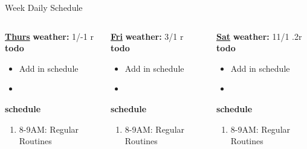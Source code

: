 {{\begin{block}{Week Daily Schedule}
\begin{columns}
          \begin{column}{0.14\textwidth}{\small \underline{\bf Thurs}}
            {\small \bf weather: } 1/-1 r \\ 
            {\small {\bf todo}} \\ 
            \begin{itemize}
              \tiny \item \tiny Add in schedule
            \item \tiny 
            \end{itemize} 
                {\small {\bf schedule}} \\
                \begin{enumerate} 
                  \tiny \item \tiny 8-9AM: Regular Routines 
                \end{enumerate}
          \end{column} 
          
          \begin{column}{0.14\textwidth}{\small \underline{\bf Fri}}
            {\small \bf weather: } 3/1 r \\ 
            {\small {\bf todo}} \\ 
            \begin{itemize}
              \tiny \item \tiny Add in schedule
            \item \tiny 
            \end{itemize} 
                {\small {\bf schedule}} \\
                \begin{enumerate} 
                  \tiny \item \tiny 8-9AM: Regular Routines 
                \end{enumerate}
          \end{column}

          \begin{column}{0.15\textwidth}{\small \underline{\bf Sat}}
            {\small \bf weather: } 11/1 .2r \\ 
            { \small {\bf todo}} \\ 
            \begin{itemize}
              \tiny \item \tiny Add in schedule
            \item \tiny 
            \end{itemize} 
                {\small {\bf schedule}} \\
                \begin{enumerate} 
                  \tiny \item \tiny 8-9AM: Regular Routines 
                \end{enumerate}
          \end{column}
          

\end{columns}
\end{block}}}
